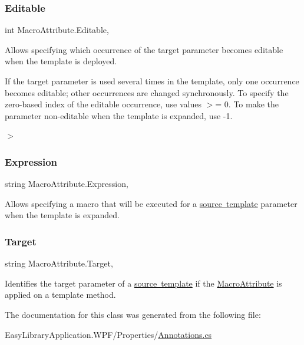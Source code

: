 \subsubsection{\texorpdfstring{Editable}{Editable}}
{\footnotesize\ttfamily int Macro\+Attribute.\+Editable\hspace{0.3cm}{\ttfamily [get]}, {\ttfamily [set]}}



Allows specifying which occurrence of the target parameter becomes editable when the template is deployed. 

If the target parameter is used several times in the template, only one occurrence becomes editable; other occurrences are changed synchronously. To specify the zero-\/based index of the editable occurrence, use values $>$= 0. To make the parameter non-\/editable when the template is expanded, use -\/1. 

$>$ \mbox{\label{class_macro_attribute_a172bf7385bb748baa1eb2fa931f1f9f8}} 
\subsubsection{\texorpdfstring{Expression}{Expression}}
{\footnotesize\ttfamily string Macro\+Attribute.\+Expression\hspace{0.3cm}{\ttfamily [get]}, {\ttfamily [set]}}



Allows specifying a macro that will be executed for a \mbox{\hyperlink{class_source_template_attribute}{source template}} parameter when the template is expanded. 

\mbox{\label{class_macro_attribute_a94502148414b928f01ad540a924846d0}} 
\subsubsection{\texorpdfstring{Target}{Target}}
{\footnotesize\ttfamily string Macro\+Attribute.\+Target\hspace{0.3cm}{\ttfamily [get]}, {\ttfamily [set]}}



Identifies the target parameter of a \mbox{\hyperlink{class_source_template_attribute}{source template}} if the \mbox{\hyperlink{class_macro_attribute}{Macro\+Attribute}} is applied on a template method. 



The documentation for this class was generated from the following file\+:\begin{DoxyCompactItemize}
\item 
Easy\+Library\+Application.\+W\+P\+F/\+Properties/\mbox{\hyperlink{_annotations_8cs}{Annotations.\+cs}}\end{DoxyCompactItemize}
